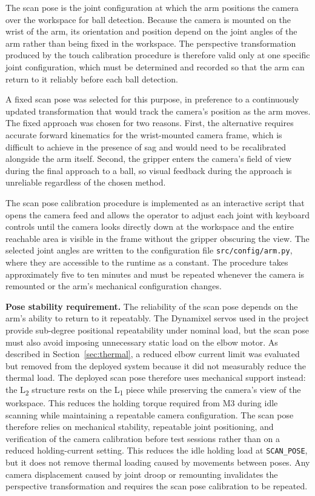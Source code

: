 \label{sec:scan-pose-calibration}

The scan pose is the joint configuration at which the arm 
positions the camera over the workspace for ball detection. 
Because the camera is mounted on the wrist of the arm, its 
orientation and position depend on the joint angles of the 
arm rather than being fixed in the workspace. The perspective 
transformation produced by the touch calibration procedure 
is therefore valid only at one specific joint configuration, 
which must be determined and recorded so that the arm can 
return to it reliably before each ball detection.

A fixed scan pose was selected for this purpose, in 
preference to a continuously updated transformation that 
would track the camera's position as the arm moves. The fixed 
approach was chosen for two reasons. First, the alternative 
requires accurate forward kinematics for the wrist-mounted 
camera frame, which is difficult to achieve in the presence 
of sag and would need to be recalibrated alongside the arm 
itself. Second, the gripper enters the camera's field of 
view during the final approach to a ball, so visual feedback 
during the approach is unreliable regardless of the chosen 
method.

The scan pose calibration procedure is implemented as an 
interactive script that opens the camera feed and allows the 
operator to adjust each joint with keyboard controls until 
the camera looks directly down at the workspace and the 
entire reachable area is visible in the frame without the 
gripper obscuring the view. The selected joint angles are 
written to the configuration file \texttt{src/config/arm.py}, 
where they are accessible to the runtime as a constant. The 
procedure takes approximately five to ten minutes and must 
be repeated whenever the camera is remounted or the arm's 
mechanical configuration changes.

\textbf{Pose stability requirement.} The reliability of the 
scan pose depends on the arm's ability to return to it 
repeatably. The Dynamixel servos used in the project provide 
sub-degree positional repeatability under nominal load, but the scan
pose must also avoid imposing unnecessary static load on the elbow
motor. As described in Section~\ref{sec:thermal}, a reduced elbow
current limit was evaluated but removed from the deployed system because
it did not measurably reduce the thermal load. The deployed scan pose
therefore uses mechanical support instead: the L\textsubscript{2}
structure rests on the L\textsubscript{1} piece while preserving the
camera's view of the workspace. This reduces the holding torque required
from M3 during idle scanning while maintaining a repeatable camera
configuration. The scan pose therefore relies on mechanical stability,
repeatable joint positioning, and verification of the camera calibration
before test sessions rather than on a reduced holding-current setting.
This reduces the idle holding load at \texttt{SCAN\_POSE}, but it does
not remove thermal loading caused by movements between poses. Any camera
displacement caused by joint droop or remounting invalidates the
perspective transformation and requires the scan pose calibration to be
repeated.
